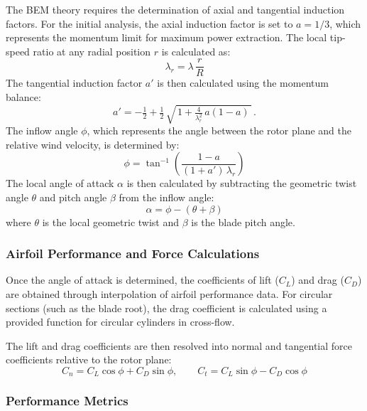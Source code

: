\documentclass[11pt]{article}
\begin{document}
The BEM theory requires the determination of axial and tangential induction factors. For the initial analysis, the axial induction factor is set to $a = 1/3$, which represents the momentum limit for maximum power extraction. The local tip-speed ratio at any radial position $r$ is calculated as:
\begin{equation}
\lambda_r = \lambda\, \frac{r}{R}
\label{eq:lambda_r}
\end{equation}
The tangential induction factor $a'$ is then calculated using the momentum balance:
\begin{equation}
a' = -\tfrac{1}{2} + \tfrac{1}{2}\, \sqrt{\,1 + \tfrac{4}{\lambda_r^{2}}\, a(1-a)\,}\, .
\label{eq:aprime}
\end{equation}
The inflow angle $\phi$, which represents the angle between the rotor plane and the relative wind velocity, is determined by:
\begin{equation}
\phi = \tan^{-1}\!\left( \frac{1 - a}{(1 + a')\,\lambda_r} \right)
\label{eq:phi}
\end{equation}
The local angle of attack $\alpha$ is then calculated by subtracting the geometric twist angle $\theta$ and pitch angle $\beta$ from the inflow angle:
\begin{equation}
\alpha = \phi - (\theta + \beta)
\label{eq:alpha}
\end{equation}
where $\theta$ is the local geometric twist and $\beta$ is the blade pitch angle.
\subsubsection{Airfoil Performance and Force Calculations}

Once the angle of attack is determined, the coefficients of lift ($C_L$) and drag ($C_D$) are obtained through interpolation of airfoil performance data. For circular sections (such as the blade root), the drag coefficient is calculated using a provided function for circular cylinders in cross-flow.

The lift and drag coefficients are then resolved into normal and tangential force coefficients relative to the rotor plane:
\begin{equation}
 C_n = C_L\cos\phi + C_D\sin\phi, \qquad C_t = C_L\sin\phi - C_D\cos\phi
\label{eq:cn_ct}
\end{equation}

\subsubsection{Performance Metrics}
\end{document}
